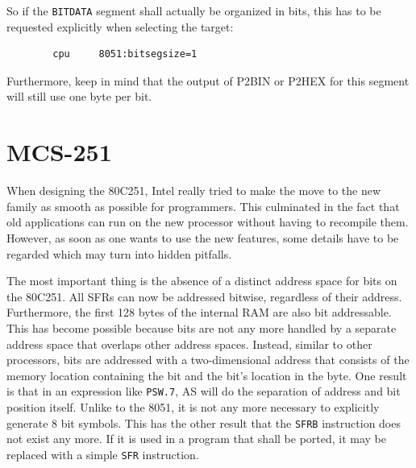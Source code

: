 \documentclass[12pt,twoside]{report}
\newcommand{\tty}[1]{{\tt #1}}
\newcommand{\asname}{{AS}}
\begin{document}
So if the {\tt BITDATA} segment shall actually be organized in bits, this
has to be requested explicitly when selecting the target:
\begin{verbatim}
        cpu     8051:bitsegsize=1
\end{verbatim}
Furthermore, keep in mind that the output of P2BIN or P2HEX for this segment
will still use one byte per bit.


\section{MCS-251}

When designing the 80C251, Intel really tried to make the move to
the new family as smooth as possible for programmers.  This
culminated in the fact that old applications can run on the new
processor without having to recompile them.  However, as soon as one
wants to use the new features, some details have to be regarded which
may turn into hidden pitfalls.

The most important thing is the absence of a distinct address space
for bits on the 80C251.  All SFRs can now be addressed bitwise,
regardless of their address.  Furthermore, the first 128 bytes of the
internal RAM are also bit addressable.  This has become possible
because bits are not any more handled by a separate address space
that overlaps other address spaces.  Instead, similar to other
processors, bits are addressed with a two-dimensional address that
consists of the memory location containing the bit and the bit's
location in the byte.  One result is that in an expression like
\tty{PSW.7}, \asname{} will do the separation of address and bit position itself.
Unlike to the 8051, it is not any more necessary to explicitly
generate 8 bit symbols.  This has the other result that the \tty{SFRB}
instruction does not exist any more.  If it is used in a program that
shall be ported, it may be replaced with a simple \tty{SFR} instruction.
\end{document}
